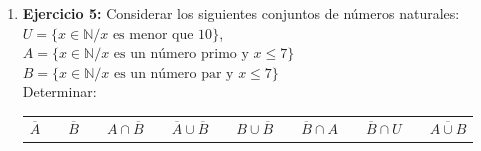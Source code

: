 \documentclass[12pt]{article}
\theoremstyle{definition}
\begin{document}
\begin{enumerate}
\item   \textbf{Ejercicio 5:} Considerar los siguientes conjuntos de números naturales: \\
$U =  \{x \in \mathbb{N} / x  \text{ es menor que 10} \}$, \\
$A =  \{x \in \mathbb{N} / x  \text{ es un número primo y } x \leq 7 \}$\\
$B =  \{x \in \mathbb{N} / x  \text{ es un número par y }  x \leq 7 \}$\\

Determinar:
\begin{table}[ H]
\begin{center} 
\begin{tabular} { c c c c c c c c c c c c c c c }
 $\overline A$ &&  $\overline B$ &&  $A \cap \overline B$ && $\overline A \cup  \overline B$ && $B \cup \overline B$ &&
 $\overline B \cap A$ &&  $\overline B \cap U$ &&  $\overline {A \cup B}$ 
 \end{tabular} 
\end{center} 
\end{table}


\end{enumerate}
\end{document}
